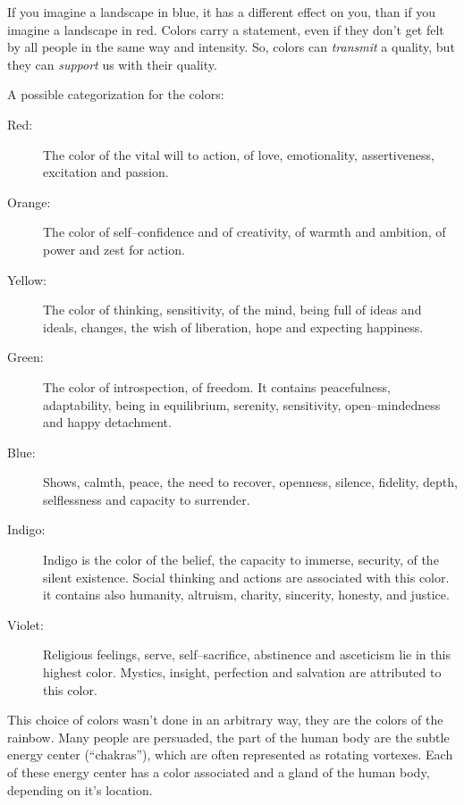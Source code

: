 \documentclass[../main.tex]{subfiles}
\begin{document}
If you imagine a landscape in blue, it has a different effect on you, than if you imagine a landscape in red. Colors carry a statement, even if they don't get felt by all people in the same way and intensity. So, colors can \emph{transmit} a quality, but they can \emph{support} us with their quality.

A possible categorization for the colors:

\begin{description}
\item[Red:] The color of the vital will to action, of love,  emotionality, assertiveness, excitation and passion.
\item[Orange:] The color of self--confidence and of creativity, of warmth and ambition, of power and zest for action.
\item[Yellow:] The color of thinking, sensitivity, of the mind, being full of ideas and ideals, changes, the wish of liberation, hope and expecting happiness.
\item[Green:] The color of introspection, of freedom. It contains peacefulness, adaptability, being in equilibrium, serenity, sensitivity, open--mindedness and happy detachment.
\item[Blue:] Shows, calmth, peace, the need to recover, openness, silence, fidelity, depth, selflessness and capacity to surrender.
\item[Indigo:] Indigo is the color of the belief, the capacity to immerse, security, of the silent existence. Social thinking and actions are associated with this color. it contains also humanity, altruism, charity, sincerity, honesty, and justice. 
  \item[Violet:] Religious feelings, serve, self--sacrifice, abstinence and asceticism lie in this highest color. Mystics, insight, perfection and salvation are attributed to this color.
  \end{description}

  This choice of colors wasn't done in an arbitrary way, they are the colors of the rainbow.
  Many people are persuaded, the part of the human body are the subtle energy center (``chakras''), which are often represented as rotating vortexes.
  Each of these energy center has a color associated and a gland of the human body, depending on it's location.
\end{document}

